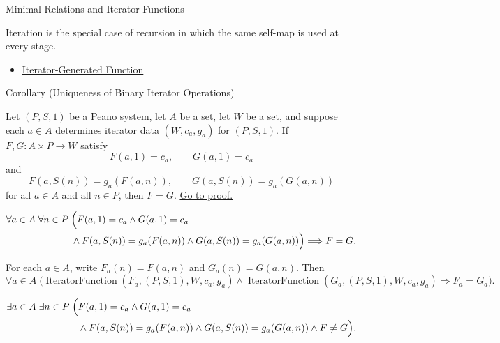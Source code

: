 \begin{topicbox}{Minimal Relations and Iterator Functions}
\begin{remark*}[Interpretation]
Iteration is the special case of recursion in which the same self-map is used
at every stage.
\end{remark*}

\begin{dependencies}
\begin{itemize}
  \item \hyperref[def:iterator-generated-function]{Iterator-Generated Function}
\end{itemize}
\end{dependencies}

\begin{corollarybox}{Corollary (Uniqueness of Binary Iterator Operations)}
\begin{corollary}
\label{cor:uniqueness-of-binary-iterator-operations}
Let $(P,S,1)$ be a Peano system, let $A$ be a set, let $W$ be a set, and
suppose each $a\in A$ determines iterator data $(W,c_a,g_a)$ for $(P,S,1)$.
If $F,G:A\times P\to W$ satisfy
\[
F(a,1)=c_a,\qquad G(a,1)=c_a
\]
and
\[
F(a,S(n))=g_a(F(a,n)),
\qquad
G(a,S(n))=g_a(G(a,n))
\]
for all $a\in A$ and all $n\in P$, then $F=G$.
\hyperref[prf:uniqueness-of-binary-iterator-operations]{Go to proof.}
\end{corollary}
\end{corollarybox}

\begin{remark*}
\[
\begin{aligned}
\forall a\in A\;\forall n\in P\;&\Bigl(
F(a,1)=c_a\land G(a,1)=c_a\\
&\land F(a,S(n))=g_a(F(a,n))
\land G(a,S(n))=g_a(G(a,n))\Bigr)
\Longrightarrow F=G.
\end{aligned}
\]
\end{remark*}

\begin{remark*}
For each $a\in A$, write $F_a(n)=F(a,n)$ and $G_a(n)=G(a,n)$. Then
\[
\forall a\in A\;
\bigl(\operatorname{IteratorFunction}(F_a,(P,S,1),W,c_a,g_a)
\land \operatorname{IteratorFunction}(G_a,(P,S,1),W,c_a,g_a)
\Longrightarrow F_a=G_a\bigr).
\]
\end{remark*}

\begin{remark*}
\[
\begin{aligned}
\exists a\in A\;\exists n\in P\;\Bigl(&
F(a,1)=c_a\land G(a,1)=c_a\\
&\land F(a,S(n))=g_a(F(a,n))
\land G(a,S(n))=g_a(G(a,n))
\land F\neq G\Bigr).
\end{aligned}
\]
\end{remark*}


\end{topicbox}
